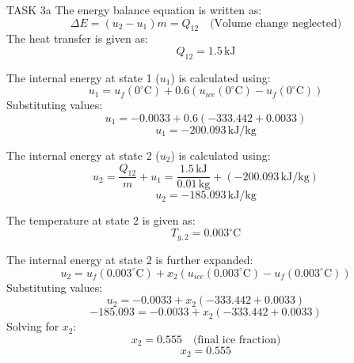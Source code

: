 TASK 3a  
The energy balance equation is written as:  
\[
\Delta E = (u_2 - u_1)m = Q_{12} \quad \text{(Volume change neglected)}
\]  
The heat transfer is given as:  
\[
Q_{12} = 1.5 \, \text{kJ}
\]  

The internal energy at state 1 (\(u_1\)) is calculated using:  
\[
u_1 = u_f(0^\circ\text{C}) + 0.6 \left( u_{ice}(0^\circ\text{C}) - u_f(0^\circ\text{C}) \right)
\]  
Substituting values:  
\[
u_1 = -0.0033 + 0.6 \left( -333.442 + 0.0033 \right)
\]  
\[
u_1 = -200.093 \, \text{kJ/kg}
\]  

The internal energy at state 2 (\(u_2\)) is calculated using:  
\[
u_2 = \frac{Q_{12}}{m} + u_1 = \frac{1.5 \, \text{kJ}}{0.01 \, \text{kg}} + (-200.093 \, \text{kJ/kg})
\]  
\[
u_2 = -185.093 \, \text{kJ/kg}
\]  

The temperature at state 2 is given as:  
\[
T_{g,2} = 0.003^\circ\text{C}
\]  

The internal energy at state 2 is further expanded:  
\[
u_2 = u_f(0.003^\circ\text{C}) + x_2 \left( u_{ice}(0.003^\circ\text{C}) - u_f(0.003^\circ\text{C}) \right)
\]  
Substituting values:  
\[
u_2 = -0.0033 + x_2 \left( -333.442 + 0.0033 \right)
\]  
\[
-185.093 = -0.0033 + x_2 \left( -333.442 + 0.0033 \right)
\]  
Solving for \(x_2\):  
\[
x_2 = 0.555 \quad \text{(final ice fraction)}
\]  
\[
x_2 = 0.555
\]